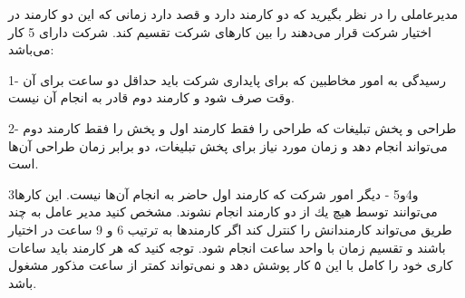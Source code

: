 \p
مدیرعاملی را در نظر بگیرید که دو کارمند دارد و قصد دارد زمانی که این دو کارمند در اختیار شرکت قرار می‌دهند را بین کار‌های شرکت تقسیم کند. شرکت دارای 5 کار می‌باشد:

1- رسیدگی به امور مخاطبین که برای پایداری شرکت باید حداقل دو ساعت برای آن وقت صرف شود و کارمند دوم قادر به انجام آن نیست.

2- طراحی و پخش تبلیغات که طراحی را فقط کارمند اول و پخش را فقط کارمند دوم می‌تواند انجام دهد و زمان مورد نیاز برای پخش تبلیغات، دو برابر زمان طراحی آن‌ها است.

3و4و5 - دیگر امور شرکت که کارمند اول حاضر به انجام آن‌ها نیست.
این کارها می‌توانند توسط هيچ يك از دو كارمند انجام نشوند.
\p
مشخص کنید مدیر عامل به چند طریق می‌تواند کارمندانش را کنترل کند اگر کارمند‌ها به ترتیب 6 و 9 ساعت در اختیار باشند و تقسیم زمان با واحد ساعت انجام شود.
توجه کنید که هر کارمند باید ساعات کاری خود را کامل با این ۵ کار پوشش دهد و نمی‌تواند کمتر از ساعت مذکور مشغول باشد.
